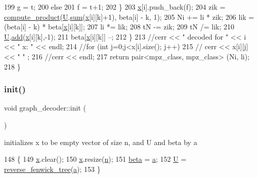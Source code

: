 \begin{DoxyCode}
199         g = t;
200       \textcolor{keywordflow}{else}
201         f = t+1;
202     \}
203     \hyperlink{classgraph__decoder_aa3f2776afe387668cf7f68109428e14e}{x}[i].push\_back(f);
204     zik = \hyperlink{compression__helper_8cpp_ae2afb43aabe50f7d42aae8f82b5a35f4}{compute\_product}(\hyperlink{classgraph__decoder_a2fa9fec2cef06aaa410e57fb59d5c1ad}{U}.\hyperlink{classreverse__fenwick__tree_a672731fd6395b4853430073a099a80e6}{sum}(\hyperlink{classgraph__decoder_aa3f2776afe387668cf7f68109428e14e}{x}[i][k]+1), beta[i] - k, 1);
205     Ni += li * zik;
206     lik = (beta[i] - k) * beta[\hyperlink{classgraph__decoder_aa3f2776afe387668cf7f68109428e14e}{x}[i][k]];
207     li *= lik;
208     tN -= zik;
209     tN /= lik;
210     \hyperlink{classgraph__decoder_a2fa9fec2cef06aaa410e57fb59d5c1ad}{U}.\hyperlink{classreverse__fenwick__tree_a942d7f49b37e53ebfec3076d177691d7}{add}(\hyperlink{classgraph__decoder_aa3f2776afe387668cf7f68109428e14e}{x}[i][k],-1);
211     beta[\hyperlink{classgraph__decoder_aa3f2776afe387668cf7f68109428e14e}{x}[i][k]] --;
212   \}
213   \textcolor{comment}{//cerr << " decoded for " << i << " x: " << endl;}
214   \textcolor{comment}{//for (int j=0;j<x[i].size(); j++)}
215   \textcolor{comment}{//  cerr << x[i][j] << " " ;}
216   \textcolor{comment}{//cerr << endl;}
217   \textcolor{keywordflow}{return} pair<mpz\_class, mpz\_class> (Ni, li);
218 \}
\end{DoxyCode}
\mbox{\label{classgraph__decoder_a97a9dcd5af21ece86fa91adcb41ca9cc}} 
\subsubsection{\texorpdfstring{init()}{init()}}
{\footnotesize\ttfamily void graph\+\_\+decoder\+::init (\begin{DoxyParamCaption}{ }\end{DoxyParamCaption})}



initializes x to be empty vector of size n, and U and beta by a 


\begin{DoxyCode}
148 \{
149   \hyperlink{classgraph__decoder_aa3f2776afe387668cf7f68109428e14e}{x}.clear();
150   \hyperlink{classgraph__decoder_aa3f2776afe387668cf7f68109428e14e}{x}.resize(\hyperlink{classgraph__decoder_a6bc1e72b2f7a913d14b789a6c2d92c1e}{n});
151   \hyperlink{classgraph__decoder_aa57c11e4c09c52101682ff83286162f7}{beta} = \hyperlink{classgraph__decoder_a9dd7c3c11b8a45a12cb7c3c2d2bfa2cc}{a};
152   \hyperlink{classgraph__decoder_a2fa9fec2cef06aaa410e57fb59d5c1ad}{U} = \hyperlink{classreverse__fenwick__tree}{reverse\_fenwick\_tree}(\hyperlink{classgraph__decoder_a9dd7c3c11b8a45a12cb7c3c2d2bfa2cc}{a});
153 \}
\end{DoxyCode}


